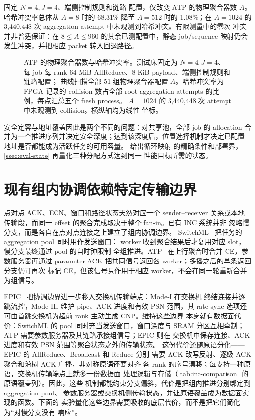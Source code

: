  固定 $N=4,J=4$、端侧控制规则和链路
配置，仅改变 ATP 的物理聚合器数 $A$。哈希冲突率总体从 $A=8$ 时的
68.31\% 降至 $A=512$ 时的 1.08\%；在 $A=1024$ 的
3,440,448 次 aggregation attempt 中未观测到哈希冲突。有限测量中的零次
冲突并非普适保证：在 $8\le A\le960$ 的其余已测配置中，静态 job/sequence
映射仍会发生冲突，并把相应 packet 转入回退路径。

\begin{figure}[t]
\centering

\caption{ATP 的物理聚合器数与哈希冲突率。测试床固定为 $N=4,J=4$、
每 job 每 rank 64-MiB AllReduce、8-KiB payload、端侧控制规则和链路配置；
曲线扫描全部 51 组物理聚合器配置 $A$。哈希冲突率为 FPGA 记录的 collision
数占全部 root aggregation attempts 的比例，每点汇总五个 fresh process。
$A=1024$ 的 3,440,448 次 attempt 中未观测到 collision。横纵轴均为线性
坐标。}
\label{fig:motivation-hash-conflicts}
\end{figure}

安全定容与地址覆盖因此是两个不同的问题：对共享池，全部 job 的 allocation
合并为一个推进序列并决定安全深度；达到该深度后，位置选择机制才决定已配置
地址是否都能成为活跃任务的可用容量。 给出循环映射
的精确条件和部署界，\cref{ssec:eval-state} 再量化三种分配方式达到同一
性能目标所需的状态。

\section{现有组内协调依赖特定传输边界}
\label{ssec:group-consistency}

点对点 ACK、ECN、窗口和路径状态天然对应一个 sender--receiver 关系或本地
传输段，而同一 offset 的聚合完成取决于整个 fan-in。已有 INC 系统并非
忽略慢分支，而是各自在点对点连接之上建立了组内协调边界。
SwitchML~\cite{switchml} 把任务的 aggregation pool 同时用作发送窗口：
worker 收到聚合结果后才复用对应 slot，慢分支最终通过 pool 的自时钟限制
全组推进。ATP~\cite{atp} 在上行聚合时合并 CE，参数服务器再通过
parameter ACK 把共同信号返回各 worker；多播之后的单条返回分支仍可再次
标记 CE，但该信号只作用于相应 worker，不会在同一轮重新合并为组信号。

EPIC~\cite{epic} 把协调边界进一步移入交换机传输端点：Mode-I 在交换机
终结连接并逐跳流控，Mode-III 维护 pipe、ACK 进度和有效 PSN 范围，其
rate-sync 选项还可由首跳交换机为超前 rank 主动生成 CNP。维持这些边界
本身就有数据面代价：SwitchML 的 pool 同时充当发送窗口，窗口深度与
SRAM 分区互相牵制；ATP 需要参数服务器及其链路承接组信号；EPIC 则在
交换机中保存连接、ACK 进度和有效 PSN 范围等聚合状态之外的传输状态。
这份代价还随原语分化——EPIC 的 AllReduce、Broadcast 和 Reduce 分别
需要 ACK 改写反射、逐级 ACK 聚合和沿树 ACK 广播，非对称原语还要对齐
各 rank 的序号漂移；每支持一种原语，交换机传输端点上就多一份数据面
处理逻辑与存储（\cref{tab:inc-comparison} 的原语覆盖列）。因此，这些
机制都能约束分支偏斜，代价是把组内推进分别绑定到 aggregation pool、
参数服务器或交换机侧传输状态，并让原语覆盖成为数据面实现的函数。下面的
实验量化这些边界需要吸收的底层代价，而不是把它们简化为``对慢分支没有
响应''。

